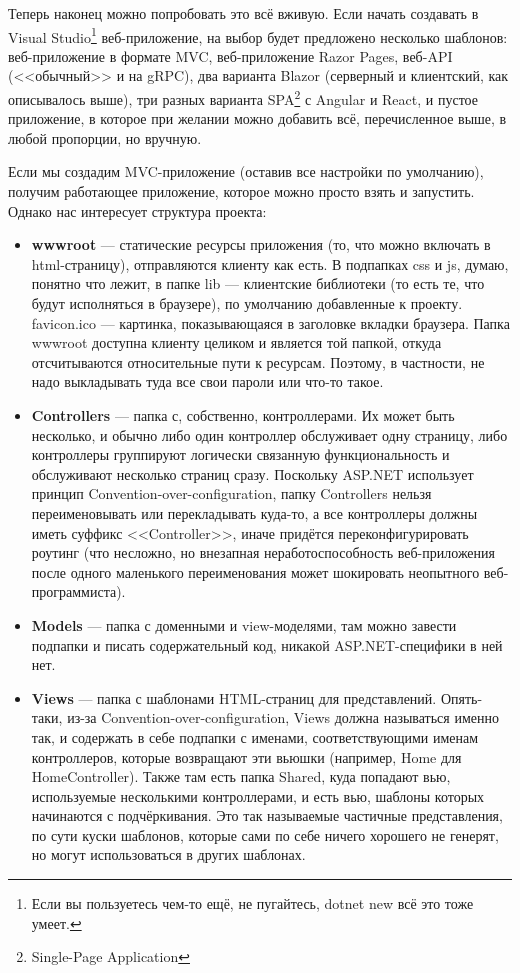 \documentclass{../../text-style}
\begin{document}
Теперь наконец можно попробовать это всё вживую. Если начать создавать в Visual Studio\footnote{Если вы пользуетесь чем-то ещё, не пугайтесь, dotnet new всё это тоже умеет.} веб-приложение, на выбор будет предложено несколько шаблонов: веб-приложение в формате MVC, веб-приложение Razor Pages, веб-API (<<обычный>> и на gRPC), два варианта Blazor (серверный и клиентский, как описывалось выше), три разных варианта SPA\footnote{Single-Page Application} с Angular и React, и пустое приложение, в которое при желании можно добавить всё, перечисленное выше, в любой пропорции, но вручную.

Если мы создадим MVC-приложение (оставив все настройки по умолчанию), получим работающее приложение, которое можно просто взять и запустить. Однако нас интересует структура проекта:

\begin{itemize}
    \item \textbf{wwwroot} --- статические ресурсы приложения (то, что можно включать в html-страницу), отправляются клиенту как есть. В подпапках css и js, думаю, понятно что лежит, в папке lib --- клиентские библиотеки (то есть те, что будут исполняться в браузере), по умолчанию добавленные к проекту. favicon.ico --- картинка, показывающаяся в заголовке вкладки браузера. Папка wwwroot доступна клиенту целиком и является той папкой, откуда отсчитываются относительные пути к ресурсам. Поэтому, в частности, не надо выкладывать туда все свои пароли или что-то такое.
    \item \textbf{Controllers} --- папка с, собственно, контроллерами. Их может быть несколько, и обычно либо один контроллер обслуживает одну страницу, либо контроллеры группируют логически связанную функциональность и обслуживают несколько страниц сразу. Поскольку ASP.NET использует принцип Convention-over-configuration, папку Controllers нельзя переименовывать или перекладывать куда-то, а все контроллеры должны иметь суффикс <<Controller>>, иначе придётся переконфигурировать роутинг (что несложно, но внезапная неработоспособность веб-приложения после одного маленького переименования может шокировать неопытного веб-программиста).
    \item \textbf{Models} --- папка с доменными и view-моделями, там можно завести подпапки и писать содержательный код, никакой ASP.NET-специфики в ней нет.
    \item \textbf{Views} --- папка с шаблонами HTML-страниц для представлений. Опять-таки, из-за Convention-over-configuration, Views должна называться именно так, и содержать в себе подпапки с именами, соответствующими именам контроллеров, которые возвращают эти вьюшки (например, Home для HomeController). Также там есть папка Shared, куда попадают вью, используемые несколькими контроллерами, и есть вью, шаблоны которых начинаются с подчёркивания. Это так называемые частичные представления, по сути куски шаблонов, которые сами по себе ничего хорошего не генерят, но могут использоваться в других шаблонах.

\end{itemize}
\end{document}
